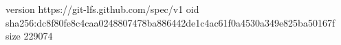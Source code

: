 version https://git-lfs.github.com/spec/v1
oid sha256:dc8f80fe8c4caa0248807478ba886442de1c4ac61f0a4530a349e825ba50167f
size 229074

